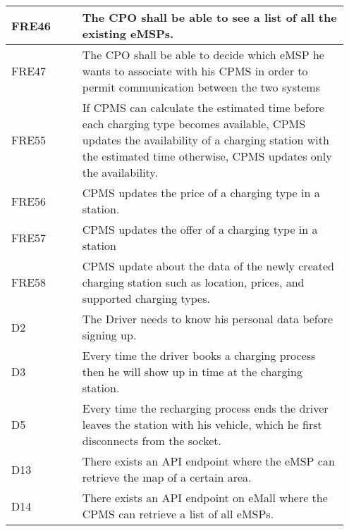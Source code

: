 {\begin{longtable}{|p{0.20\linewidth}p{0.75\linewidth}|}
    \hline
    \rowcolor{bluepoli!15}
    FRE46 & The CPO shall be able to see a list of all the existing eMSPs. \\
    \hline
    \rowcolor{bluepoli!15} FRE47 & The CPO shall be able to decide which eMSP he wants to associate with his CPMS in order to permit communication between the two systems \\
    \hline
    \rowcolor{bluepoli!15} FRE55 & If CPMS can calculate the estimated time before each charging type becomes available, CPMS updates the availability of a charging station with the estimated time otherwise, CPMS updates only the availability. \\
    \hline
    \rowcolor{bluepoli!15} FRE56 & CPMS updates the price of a charging type in a station. \\
    \hline  
    \rowcolor{bluepoli!15} FRE57 & CPMS updates the offer of a charging type in a station \\
    \hline  
     \rowcolor{bluepoli!15}
     FRE58 & CPMS update about the data of the newly created charging station such as location, prices, and supported charging types. \\
     \hline
    \rowcolor{bluepoli!5} D2 & The Driver needs to know his personal data before signing up.  \\
    \hline
    \rowcolor{bluepoli!5} D3 & Every time the driver books a charging process then he will show up in time at the charging station. \\
    \hline   
    \rowcolor{bluepoli!5} D5 & Every time the recharging process ends the driver leaves the station with his vehicle, which he first disconnects from the socket. \\
    \hline  
    \rowcolor{bluepoli!5} D13 & There exists an API endpoint where the eMSP can retrieve the map of a certain area. \\
    \hline 
    \rowcolor{bluepoli!5} D14 & There exists an API endpoint on eMall where the CPMS can retrieve a list of all eMSPs. \\
    \hline 
\end{longtable}}
